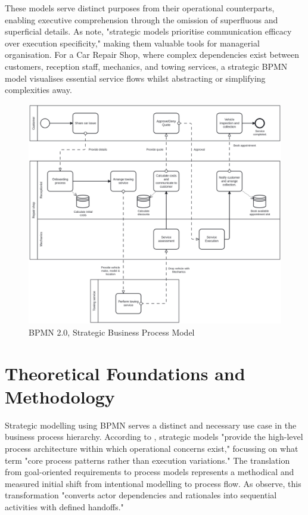 \documentclass[14pt,a4paper]{article}
\begin{document}
These models serve distinct purposes from their operational counterparts, enabling executive comprehension through the omission of superfluous and superficial details. As \textcite[p. 152]{Dijkman2011} note, "strategic models prioritise communication efficacy over execution specificity," making them valuable tools for managerial organisation. For a Car Repair Shop, where complex dependencies exist between customers, reception staff, mechanics, and towing services, a strategic BPMN model visualises essential service flows whilst abstracting or simplifying complexities away.


\begin{figure}[ht]
  \hspace{-6.5em}
    \begin{minipage}[t]{1.3\textwidth}
        \includegraphics[width=\linewidth]{strategic.png}
        \caption{BPMN 2.0, Strategic Business Process Model}
    \end{minipage}
\end{figure}

\section{Theoretical Foundations and Methodology}

Strategic modelling using BPMN serves a distinct and necessary use case in the business process hierarchy. According to \textcite[p. 17]{Allweyer2016}, strategic models "provide the high-level process architecture within which operational concerns exist," focussing on what \textcite[p. 89]{Dumas2018} term "core process patterns rather than execution variations." The translation from goal-oriented requirements to process models represents a methodical and measured initial shift from intentional modelling to process flow. As \textcite[p. 342]{Dalpiaz2016} observe, this transformation "converts actor dependencies and rationales into sequential activities with defined handoffs."
\end{document}
